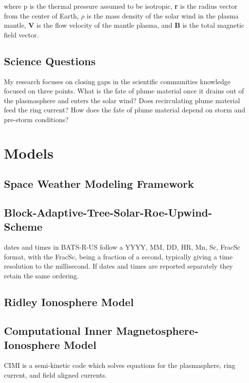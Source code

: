 \documentclass[utf8]{report}
\newcommand{\BATS}[1][0]{BATS-R-US }
\begin{document}
where p is the thermal pressure assumed to be isotropic, \textbf{r} is the radius vector from the center of Earth, $\rho$ is the mass density of the solar wind in the plasma mantle, \textbf{V} is the flow velocity of the mantle plasma, and \textbf{B} is the total magnetic field vector. 

\section{Science Questions}

My research focuses on closing gaps in the scientific communities knowledge
focused on three points. 
What is the fate of plume material once it drains out of the plasmasphere and enters the solar wind?
Does recirculating plume material feed the ring current?
How does the fate of plume material depend on storm and pre-storm conditions?

\chapter{Models}
\section{Space Weather Modeling Framework}

\section{Block-Adaptive-Tree-Solar-Roe-Upwind-Scheme}

dates and times in \BATS follow a YYYY, MM, DD, HR, Mn, Sc, FracSc format, with the FracSc, being a fraction of a second, typically giving a time resolution to the millisecond. If dates and times are reported separately they retain the same ordering. 

\section{Ridley Ionosphere Model}

\section{Computational Inner Magnetosphere-Ionosphere Model}
CIMI is a semi-kinetic code which solves equations for the plasmasphere, ring current, and field aligned currents.
\end{document}
